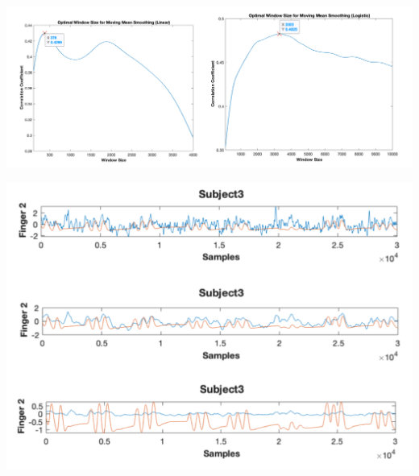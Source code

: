 \documentclass{article}
\begin{document}
	\begin{minipage}{\linewidth}
        \centering
	    \includegraphics[scale=0.5]{groupwindow.png}
	    \label{fig2}
	\end{minipage}
	
		\begin{minipage}{\linewidth}
        \centering
	    \includegraphics[scale=0.6]{groupdsignals.png}
	    \label{fig3}
	\end{minipage}\\\\
\end{document}
